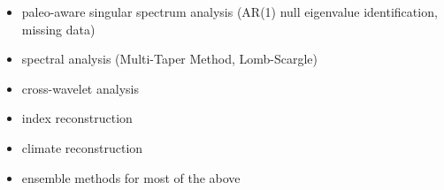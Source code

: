 \documentclass[letterpaper,10pt,english]{sphinxmanual}
\begin{document}
\begin{itemize}
\item {} 
paleo-aware singular spectrum analysis (AR(1) null eigenvalue identification, missing data)

\item {} 
spectral analysis (Multi-Taper Method, Lomb-Scargle)

\item {} 
cross-wavelet analysis

\item {} 
index reconstruction

\item {} 
climate reconstruction

\item {} 
ensemble methods for most of the above

\end{itemize}
\end{document}
